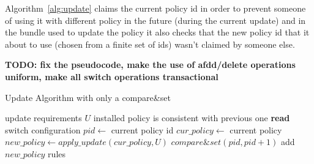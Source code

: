 \documentclass[conference]{sigcomm-alternate}
\newcommand{\hide}[1]{}
\begin{document}
Algorithm~\ref{alg:update} claims the current policy id in order to prevent someone of using it with different policy in the future (during the current update) and in the bundle used to update the policy it also checks that the new policy id that it about to use (chosen from a finite set of ids) wasn't claimed by someone else. 

\hide{
We compute our new suggested policy by applying the update requests on top of current policy, supporting any kind of requests and policies. Then we make a transaction (using the bundle feature) to atomically check that our policy id is not blocked by anyone else, to change the current policy id to ours (an action that would fail if the current policy id is no longer what we are counting of) and to actually configure our new policy.

If one of the actions in the transaction fails we try again. There is no progress guaranty for each controller but there is one for the whole system - at least one of the controller will succeed in fulfilling its update requirements.
}



\textbf{TODO: fix the pseudocode, make the use of afdd/delete
  operations uniform, make all switch operations transactional}



\begin{algorithm}[t]
    \caption{Update Algorithm with only a compare\&set}
    \label{alg:simple-update}
    \begin{algorithmic}[1]
    \Require update requirements $U$
    \Ensure installed policy is consistent with previous one
 		\Repeat
 			\State \textbf{read} switch configuration
 			\State $pid\gets$ current policy id 
 			\State $cur\_policy\gets$ current policy
 			\State $new\_policy\gets apply\_update(cur\_policy,U)$
 			\startBundle
	 			\State $compare\&set(pid,pid+1)$
	 			\State add $new\_policy$ rules %
 			\endBundle
			\Return

    \end{algorithmic}
\end{algorithm}
\end{document}
